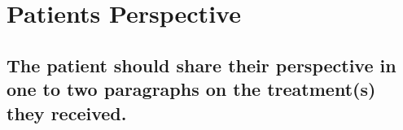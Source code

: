 
\section{Patients Perspective}
\subsection{The patient should share their perspective in one to two paragraphs on the treatment(s) they received.}
